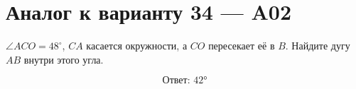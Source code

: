 


\section*{Аналог к варианту 34 — A02}
\(\angle ACO=48^\circ\), \(CA\) касается окружности, а \(CO\) пересекает её в \(B\). Найдите дугу \(AB\) внутри этого угла.
\begin{center}\figTangentSecantReverse\end{center}
\[\boxed{\text{Ответ: }42°}\]

